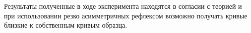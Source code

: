 Результаты полученные в ходе эксперимента находятся в согласии с теорией и при использовании резко
асимметричных рефлексом возможно получать кривые близкие к собственным кривым образца.

